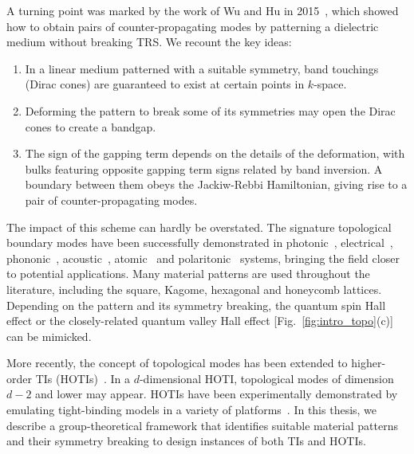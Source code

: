A turning point was marked by the work of Wu and Hu in 2015~\cite{Wu_Hu_2015}, which showed how to obtain pairs of counter-propagating modes by patterning a dielectric medium without breaking TRS. We recount the key ideas:%
%
\begin{enumerate}

	\item In a linear medium patterned with a suitable symmetry, band touchings (Dirac cones) are guaranteed to exist at certain points in $k$-space.

	\item Deforming the pattern to break some of its symmetries may open the Dirac cones to create a bandgap.

	\item The sign of the gapping term depends on the details of the deformation, with bulks featuring opposite gapping term signs related by band inversion. A boundary between them obeys the Jackiw-Rebbi Hamiltonian, giving rise to a pair of counter-propagating modes.

\end{enumerate}
%
The impact of this scheme can hardly be overstated. The signature topological boundary modes have been successfully demonstrated in photonic~\cite{Li_2018, Ozawa_2019}, electrical~\cite{Ningyuan_2015, Hofmann_2019}, phononic~\cite{Nash_2015,  Mousavi_2015, Huber_2016}, acoustic~\cite{He_2016, Ma_2019}, atomic~\cite{Cooper_2019} and polaritonic~\cite{Milicevic_2015} systems, bringing the field closer to potential applications. Many material patterns are used throughout the literature, including the square, Kagome, hexagonal and honeycomb lattices. Depending on the pattern and its symmetry breaking, the quantum spin Hall effect or the closely-related quantum valley Hall effect [Fig.~\ref{fig:intro_topo}(c)] can be mimicked. 

More recently, the concept of topological modes has been extended to higher-order TIs (HOTIs)~\cite{Kraus_2013,Benalcazar_2017a,Benalcazar_2017b,Petrides_2018, Zilberberg_2018, Benalcazar_2019, Calugaru_2019, Fukui_2019, Petrides_2020}. In a $d$-dimensional HOTI, topological modes of dimension $d-2$ and lower may appear. HOTIs have been experimentally demonstrated by emulating tight-binding models in a variety of platforms~\cite{Imhof_2018, Noh_2018, Schindler_2018, Serra-Garcia_2018, Fan_2019, Xue_2019, Xie_2018, Zhang_2019, Zhang_2020, Zhou_2020}. In this thesis, we describe a group-theoretical framework that identifies suitable material patterns and their symmetry breaking to design instances of both TIs and HOTIs. 

